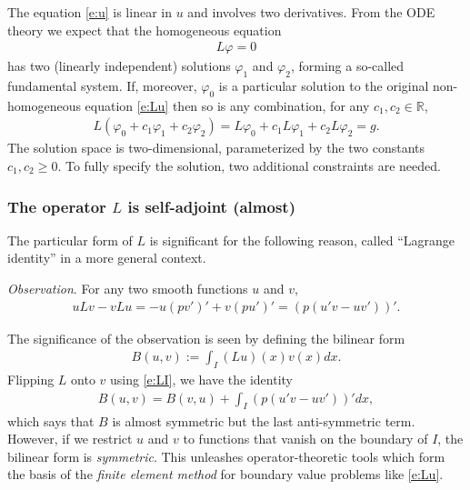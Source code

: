 \documentclass[12pt,a4paper]{article}
\newcommand{\IR}{\mathbb{R}}
\begin{document}
    The equation \eqref{e:u} is linear in $u$ and involves two derivatives.
    From the ODE theory we expect that
    the homogeneous equation
    \begin{align}
        \label{e:L0}
        L \varphi = 0
    \end{align}
    has two (linearly independent) solutions
    $\varphi_1$ and $\varphi_2$,
    forming a so-called fundamental system.
    If, moreover, $\varphi_0$ is a particular solution
    to the original non-homogeneous equation \eqref{e:Lu}
    then so is any combination,
    for any $c_1, c_2 \in \IR$,
    \begin{align}
        L(\varphi_0 + c_1 \varphi_1 + c_2 \varphi_2)
        =
        L \varphi_0
        +
        c_1 L \varphi_1
        +
        c_2 L \varphi_2
        = 
        g
        .
    \end{align}
    The solution space is two-dimensional,
    parameterized by the two constants $c_1, c_2 \geq 0$.
    To fully specify the solution,
    two additional constraints are needed.
    
    
    
    \subsubsection*{The operator $L$ is self-adjoint (almost)}
    
    The particular form of $L$ is significant 
    for the following reason,
    called ``Lagrange identity'' in a more general context.
    
    \emph{Observation}.
    For any two smooth functions $u$ and $v$,
    \begin{align}
        \label{e:LI}
        u L v - v L u
        =
        - u (p v')'
        + v (p u')'
        =
        (p (u' v - u v'))'
        .
    \end{align}

    
    The significance of the observation 
    is seen by defining
    the bilinear form
    \begin{align}
        B(u, v) 
        :=
        \int_I (L u)(x) v(x) dx
        .
    \end{align}
    Flipping $L$ onto $v$ using \eqref{e:LI}, 
    we have the identity
    \begin{align}
        B(u, v)
        =
        B(v, u)
        +
        \int_I (p (u' v - u v'))' dx
        ,
    \end{align}
    which says that $B$ is almost symmetric
    but the last anti-symmetric term.
    However,
    if we restrict $u$ and $v$ to functions
    that vanish on the boundary of $I$,
    the bilinear form is \emph{symmetric}.
    This unleashes operator-theoretic tools
    which form the basis of 
    the \emph{finite element method}
    for boundary value problems like \eqref{e:Lu}.
    
\end{document}
